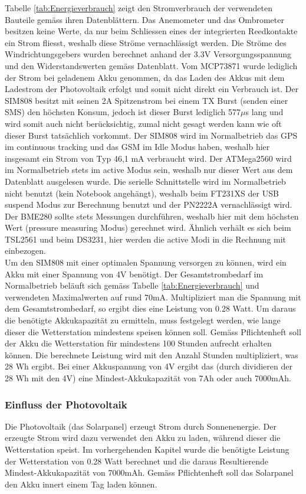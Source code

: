 \newpage
Tabelle \ref{tab:Energieverbrauch} zeigt den Stromverbrauch der verwendeten Bauteile gemäss ihren Datenblättern. Das Anemometer und das Ombrometer besitzen keine Werte, da nur beim Schliessen eines der integrierten Reedkontakte ein Strom fliesst, weshalb diese Ströme vernachlässigt werden. Die Ströme des Windrichtungsgebers wurden berechnet anhand der 3.3V Versorgungsspannung und den Widerstandswerten gemäss Datenblatt. Vom MCP73871 wurde lediglich der Strom bei geladenem Akku genommen, da das Laden des Akkus mit dem Ladestrom der Photovoltaik erfolgt und somit nicht direkt ein Verbrauch ist. Der SIM808 besitzt mit seinen 2A Spitzenstrom bei einem TX Burst (senden einer SMS) den höchsten Konsum, jedoch ist dieser Burst lediglich 577$\mu$s lang und wird somit auch nicht berücksichtig, zumal nicht gesagt werden kann wie oft dieser Burst tatsächlich vorkommt. Der SIM808 wird im Normalbetrieb das GPS im continuous tracking und das GSM im Idle Modus haben, weshalb hier insgesamt ein Strom von Typ 46,1 mA verbraucht wird. Der ATMega2560 wird im Normalbetrieb stets im active Modus sein, weshalb nur dieser Wert aus dem Datenblatt ausgelesen wurde. Die serielle Schnittstelle wird im Normalbetrieb nicht benutzt (kein Notebook angehängt), weshalb beim FT231XS der USB suspend Modus zur Berechnung benutzt und der PN2222A vernachlässigt wird. Der BME280 sollte stets Messungen durchführen, weshalb hier mit dem höchsten Wert (pressure measuring Modus) gerechnet wird. Ähnlich verhält es sich beim TSL2561 und beim DS3231, hier werden die active Modi in die Rechnung mit einbezogen.\\[0.5cm]
Um den SIM808 mit einer optimalen Spannung versorgen zu können, wird ein Akku mit einer Spannung von 4V benötigt. Der Gesamtstrombedarf im Normalbetrieb beläuft sich gemäss Tabelle \ref{tab:Energieverbrauch} und verwendeten Maximalwerten auf rund 70mA. Multipliziert man die Spannung mit dem Gesamtstrombedarf, so ergibt dies eine Leistung von 0.28 Watt. Um daraus die benötigte Akkukapazität zu ermitteln, muss festgelegt werden, wie lange dieser die Wetterstation mindestens speisen können soll. Gemäss Pflichtenheft soll der Akku die Wetterstation für mindestens 100 Stunden aufrecht erhalten können. Die berechnete Leistung wird mit den Anzahl Stunden multipliziert, was 28 Wh ergibt. Bei einer Akkuspannung von 4V ergibt das (durch dividieren der 28 Wh mit den 4V) eine Mindest-Akkukapazität von 7Ah oder auch 7000mAh.
\subsubsection{Einfluss der Photovoltaik}
Die Photovoltaik (das Solarpanel) erzeugt Strom durch Sonnenenergie. Der erzeugte Strom wird dazu verwendet den Akku zu laden, während dieser die Wetterstation speist. Im vorhergehenden Kapitel wurde die benötigte Leistung der Wetterstation von 0.28 Watt berechnet und die daraus Resultierende Mindest-Akkukapazität von 7000mAh. Gemäss Pflichtenheft soll das Solarpanel den Akku innert einem Tag laden können.\\

